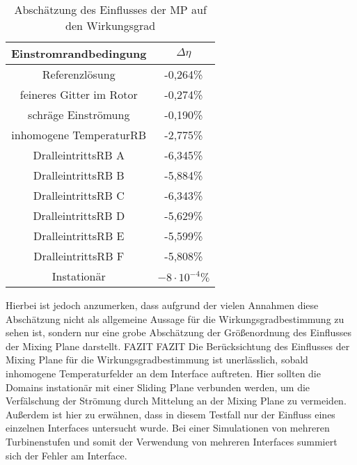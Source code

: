 \begin{table}[htbp]
\centering
\caption{Abschätzung des Einflusses der MP auf den Wirkungsgrad}
\begin{tabular}{ c| c}
Einstromrandbedingung&$\Delta \eta$\\
\toprule
Referenzlösung&-0,264\%\\
feineres Gitter im Rotor&-0,274\%\\
schräge Einströmung&-0,190\% \\
inhomogene TemperaturRB&-2,775\% \\
DralleintrittsRB A&-6,345\% \\
DralleintrittsRB B&-5,884\% \\
DralleintrittsRB C&-6,343\% \\
DralleintrittsRB D&-5,629\% \\
DralleintrittsRB E&-5,599\% \\
DralleintrittsRB F&-5,808\% \\
\midrule
Instationär&$-8 \cdot 10^{-4}\%$ \\
\end{tabular}
\label{tab:kanalwg}
\end{table}
Hierbei ist jedoch anzumerken, dass aufgrund der vielen Annahmen diese Abschätzung nicht als allgemeine Aussage für die Wirkungsgradbestimmung zu sehen ist, sondern nur eine grobe Abschätzung der Größenordnung des Einflusses der Mixing Plane darstellt.
FAZIT FAZIT
Die Berücksichtung des Einflusses der Mixing Plane für die Wirkungsgradbestimmung ist unerlässlich, sobald inhomogene Temperaturfelder an dem Interface auftreten. Hier sollten die Domains instationär mit einer Sliding Plane verbunden werden, um die Verfälschung der Strömung durch Mittelung an der Mixing Plane zu vermeiden. Außerdem ist hier zu erwähnen, dass in diesem Testfall nur der Einfluss eines einzelnen Interfaces untersucht wurde. Bei einer Simulationen von mehreren Turbinenstufen und somit der Verwendung von mehreren Interfaces summiert sich der Fehler am Interface.



